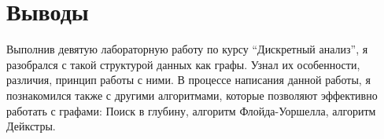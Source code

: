 \section{Выводы}
Выполнив девятую лабораторную работу по курсу \enquote{Дискретный анализ}, я разобрался с такой структурой данных как графы. Узнал их особенности, различия, принцип работы с ними. В процессе написания данной работы, я познакомился также с другими алгоритмами, которые позволяют эффективно работать с графами: Поиск в глубину, алгоритм Флойда-Уоршелла, алгоритм Дейкстры.
\pagebreak